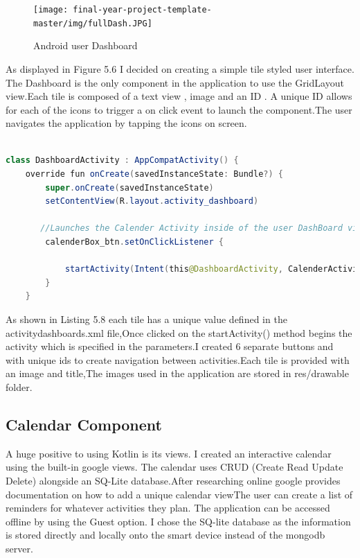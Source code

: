   \begin{figure}[H]
  \centering
    \texttt{[image: final-year-project-template-master/img/fullDash.JPG]}
     \caption{Android user Dashboard}
\end{figure}

As displayed in Figure 5.6 I decided on creating a simple tile styled user interface. The Dashboard is the only component in the application to use the GridLayout view.Each tile is composed of a text view , image and an ID . A unique ID allows for each of the icons to trigger a on click event to launch the component.The user navigates the application by tapping the icons on screen.


\begin{lstlisting}[language=Java, caption=Dashboard Kotlin Activity code stubs ]

class DashboardActivity : AppCompatActivity() {
    override fun onCreate(savedInstanceState: Bundle?) {
        super.onCreate(savedInstanceState)
        setContentView(R.layout.activity_dashboard)

       //Launches the Calender Activity inside of the user DashBoard view
        calenderBox_btn.setOnClickListener {

            startActivity(Intent(this@DashboardActivity, CalenderActivity::class.java))
        }
    }

\end{lstlisting}

As shown in Listing 5.8 each tile has a unique value defined in the activitydashboards.xml file,Once clicked on the startActivity() method begins the activity which is specified in the parameters.I created 6 separate buttons and with unique ids to create navigation between activities.Each tile is provided with an image and title,The images used in the application are stored in res/drawable folder. 


\subsection{Calendar Component}
A huge positive to using Kotlin is its views. I created an interactive calendar using the built-in google views. The calendar uses CRUD (Create Read Update Delete) alongside an SQ-Lite database.After researching online google provides documentation on how to add a unique calendar view\cite{calenderview}The user can create a list of reminders for whatever activities they plan. The application can be accessed offline by using the Guest option. I chose the SQ-lite database as the information is stored directly and locally onto the smart device instead of the mongodb server.


